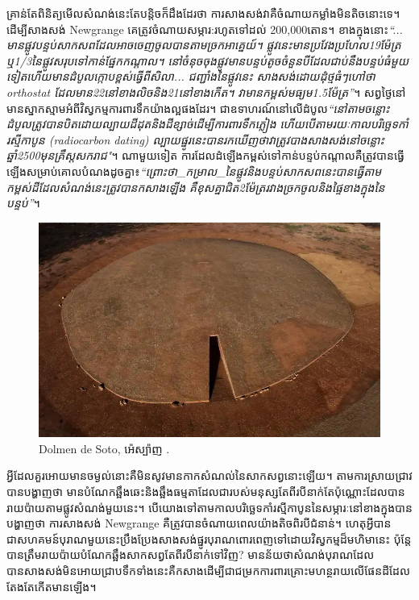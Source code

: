 \documentclass[10pt,twocolumn,letterpaper]{article}
\begin{document}
គ្រាន់តែពិនិត្យមើលសំណង់នេះតែបន្តិចក៏ដឹងដែរថា ការសាងសង់វាគឺចំណាយកម្លាំងមិនតិចនោះទេ។ ដើម្បីសាងសង់ Newgrange គេត្រូវចំណាយសម្ភារ:រហូតទៅដល់ 200,000តោន។ ខាងក្នុងនោះ\textit{“... មានផ្លូវបន្ទប់សាកសពដែលអាចចេញចូលបានតាមច្រកអាគ្នេយ៍។ ផ្លូវនេះមានប្រវែងប្រហែល19ម៉ែត្រ ឬ1/3នៃផ្លូវសរុបទៅកាន់ផ្នែកកណ្ដាល។ នៅចំនុចចុងផ្លូវមានបន្ទប់តូចចំនួនបីដែលជាប់នឹងបន្ទប់ធំមួយទៀតហើយមានដំបូលក្កោបខ្ពស់ធ្វើពីសិលា... ជញ្ជាំងនៃផ្លូវនេះ សាងសង់ដោយដុំថ្មធំៗហៅថា orthostat ដែលមាន22នៅខាងលិចនិង21នៅខាងកើត។ វាមានកម្ពស់មធ្យម1.5ម៉ែត្រ”}\cite{70}។ សព្វថ្ងៃនៅមានស្នាកស្មាមអំពីវិស្វកម្មការពារទឹកយ៉ាងល្អផងដែរ។ ជាឧទាហរណ៍នៅលើដំបូល\textit{“នៅតាមចន្លោះដំបូលត្រូវបានបិតដោយល្បាយដីដុតនិងដីខ្សាច់ដើម្បីការពារទឹកភ្លៀង ហើយបើតាមរយៈកាលបរិច្ឆេទកាំរស្មីកាបូន (radiocarbon dating) ល្បាយផ្នូរនេះបានរកឃើញថាវាត្រូវបាងសាងសង់នៅចន្លោះឆ្នាំ2500មុនគ្រឹស្តសករាជ"}\cite{71}។ ណាមួយទៀត ការដែលដំឡើងកម្ពស់ទៅកាន់បន្ទប់កណ្តាលគឺត្រូវបានធ្វើឡើងសម្រាប់គោលបំណងដូចគ្នា៖\textit{“ព្រោះថា\_កម្រាល\_នៃផ្លូវនិងបន្ទប់សាកសពនេះបានធ្វើតាមកម្ពស់ដីដែលសំណង់នេះត្រូវបានកសាងឡើង គឺខុសគ្នាជិត2ម៉ែត្ររវាងច្រកចូលនិងផ្ទៃខាងក្នុងនៃបន្ទប់”}\cite{71}។

\begin{figure}[t]
\begin{center}
   \includegraphics[width=1\linewidth]{dolmen.jpg}
\end{center}
   \caption{Dolmen de Soto, អ៉េស្ប៉ាញ \cite{53}.}
\label{fig:9}
\label{fig:onecol}
\end{figure}

អ្វីដែលគួរអោយមានចម្ងល់នោះគឺមិនសូវមានកាកសំណល់នៃសាកសព្វនោះឡើយ។ តាមការស្រាយជ្រាវបានបង្ហាញថា មានបំណែកឆ្អឹងឆេះនិងឆ្អឹងធម្មតាដែលជារបស់មនុស្សតែពីរបីនាក់តែប៉ុណ្ណោះដែលបានរាយប៉ាយតាមផ្លូវសំណង់មួយនេះ។ បើយោងទៅតាមកាលបរិច្ឆេទកាំរស្មីកាបូននៃសម្ភារៈនៅខាងក្នុងបានបង្ហាញថា ការសាងសង់ Newgrange គឺត្រូវបានចំណាយពេលយ៉ាងតិចពិរបីជំនាន់។ ហេតុអ្វីបានជាសហគមន៍បុរាណមួយនេះប្រឹងប្រែងសាងសង់ផ្នូរបុរាណពោរពេញទៅដោយវិស្វកម្មដ៏មហិមានេះ ប៉ុន្តែបានត្រឹមរាយប៉ាយបំណែកឆ្អឹងសាកសព្វតែពីរបីនាក់ទៅវិញ? មានន័យថាសំណង់បុរាណដែលបានសាងសង់មិនអោយជ្រាបទឹកទាំងនេះគឺកសាងដើម្បីជាជម្រកការពារគ្រោះមហន្ថរាយលើផែនដីដែលតែងតែកើតមានឡើង។
\end{document}
